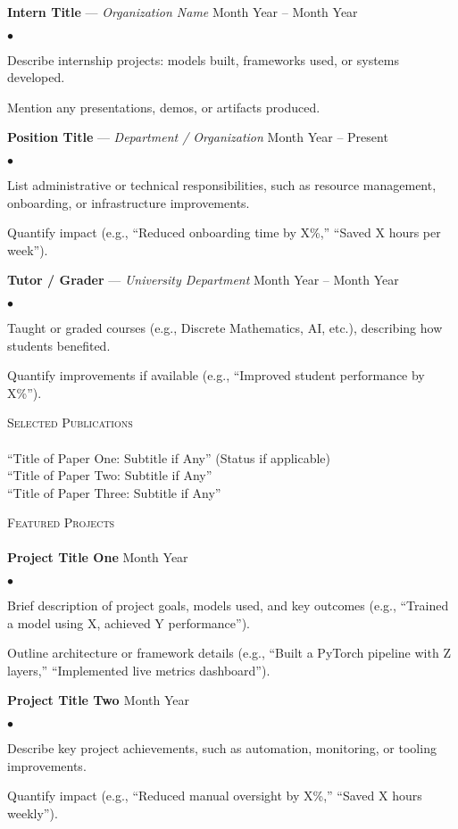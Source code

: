 \documentclass[10.5pt]{article}
\newcommand{\lineunder}{\vspace*{-8pt} \\ \hspace*{-18pt} \hrulefill \\}
\newcommand{\header}[1]{{\hspace*{-15pt}\vspace*{6pt} \textsc{#1}} \vspace*{-6pt} \lineunder}
\newcommand{\employer}[3]{{\textbf{#1} — \textit{#2} \hfill #3}}
\newcommand{\paper}[2]{{#1}}
\newcommand{\project}[2]{{\textbf{#1} \hfill #2}}
\newenvironment{achievements}
  {\begin{list}{$\bullet$}{\topsep 0pt \itemsep -2pt}}  
  {\end{list}}
\begin{document}
\employer{Intern Title}{Organization Name}{Month Year – Month Year}
\begin{achievements}
    \item Describe internship projects: models built, frameworks used, or systems developed.
    \item Mention any presentations, demos, or artifacts produced.
\end{achievements}

\employer{Position Title}{Department / Organization}{Month Year – Present}
\begin{achievements}
    \item List administrative or technical responsibilities, such as resource management, onboarding, or infrastructure improvements.
    \item Quantify impact (e.g., “Reduced onboarding time by X\%,” “Saved X hours per week”).
\end{achievements}

\employer{Tutor / Grader}{University Department}{Month Year – Month Year}
\begin{achievements}
    \item Taught or graded courses (e.g., Discrete Mathematics, AI, etc.), describing how students benefited.
    \item Quantify improvements if available (e.g., “Improved student performance by X\%”).
\end{achievements}

\header{Selected Publications}
\paper{“Title of Paper One: Subtitle if Any” (Status if applicable)}, \href{https://link.to.paper.one}{\faExternalLink*} \\
\paper{“Title of Paper Two: Subtitle if Any”}, \href{https://link.to.paper.two}{\faExternalLink*} \\
\paper{“Title of Paper Three: Subtitle if Any”}, \href{https://link.to.paper.three}{\faExternalLink*}

\header{Featured Projects}
\project{Project Title One}{Month Year}
\begin{achievements}
    \item Brief description of project goals, models used, and key outcomes (e.g., “Trained a model using X, achieved Y performance”).
    \item Outline architecture or framework details (e.g., “Built a PyTorch pipeline with Z layers,” “Implemented live metrics dashboard”).
\end{achievements}

\project{Project Title Two \href{https://github.com/yourusername/project-repo}{\faExternalLink*}}{Month Year}
\begin{achievements}
    \item Describe key project achievements, such as automation, monitoring, or tooling improvements.
    \item Quantify impact (e.g., “Reduced manual oversight by X\%,” “Saved X hours weekly”).
\end{achievements}
\end{document}
